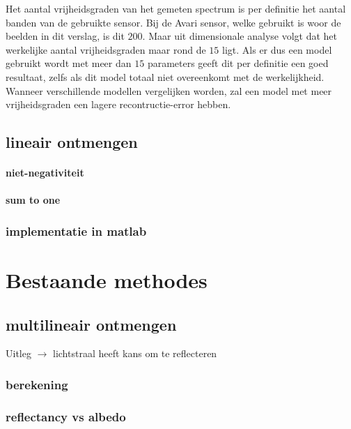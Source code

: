 \documentclass[12pt]{report}
\begin{document}
Het aantal vrijheidsgraden van het gemeten spectrum is per definitie het aantal banden van de gebruikte sensor. Bij de Avari sensor, welke gebruikt is woor de beelden in dit verslag, is dit $200$. Maar uit dimensionale analyse volgt dat het werkelijke aantal vrijheidsgraden maar rond de $15$ ligt. Als er dus een model gebruikt wordt met meer dan $15$ parameters geeft dit per definitie een goed resultaat, zelfs als dit model totaal niet overeenkomt met de werkelijkheid. Wanneer verschillende modellen vergelijken worden, zal een model met meer vrijheidsgraden een lagere recontructie-error hebben.  

\section{lineair ontmengen}




\subsubsection{niet-negativiteit}

\subsubsection{sum to one}



\subsection{implementatie in matlab}

\chapter{Bestaande methodes} \label{sec:select}

\section{multilineair ontmengen}

Uitleg $\rightarrow$ lichtstraal heeft kans om te reflecteren

\subsection{berekening}

\subsection{reflectancy vs albedo}
\end{document}
